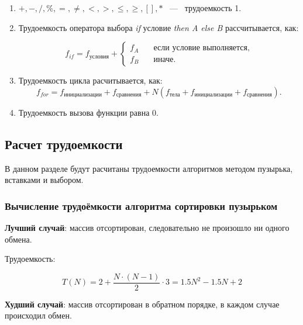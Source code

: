 \documentclass[14pt,russian]{scrartcl}
\begin{document}
\begin{enumerate}
    \item $+, -, /, \%, =, \neq, <, >, \leq, \geq, [ ], *$ ~---~ трудоемкость 1.
    \item Трудоемкость оператора выбора \textit{if} условие \textit{then A else B} рассчитывается, как: 
    
    \begin{equation}
        f_{if} = f_{\text{условия}} + \begin{cases}
                                f_A & \quad \text{если условие выполняется,} \\
                                f_B & \quad \text{иначе}.
                                \end{cases}
    \end{equation}

    \item Трудоемкость цикла расчитывается, как:
    \begin{equation}
        f_{for} = f_{\text{инициализации}} + f_{\text{сравнения}} + N(f_{\text{тела}} + f_{\text{инициализации}} + f_{\text{сравнения}}).
    \end{equation}

    \item Трудоемкость вызова функции равна 0.
\end{enumerate}

\subsection{Расчет трудоемкости}

В данном разделе будут расчитаны трудоемкости алгоритмов методом пузырька, вставками и выбором.

\subsubsection{Вычисление трудоёмкости алгоритма сортировки пузырьком}

\textbf{Лучший случай}: массив отсортирован, следовательно не произошло ни одного обмена.

Трудоемкость:

\begin{equation}
    T(N) = 2 + \frac{N \cdot (N - 1)}{2}\cdot 3 = 1.5N^2 - 1.5N + 2
\end{equation}

\textbf{Худший случай}: массив отсортирован в обратном порядке, в каждом случае происходил обмен.
\end{document}
